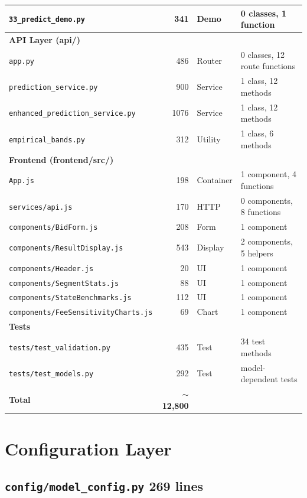 \documentclass[11pt,a4paper]{article}
\newcommand{\file}[1]{\texttt{\color{gssblue!70!black}#1}}
\newcommand{\conftag}[1]{\colorbox{configorange!15}{\small\textcolor{configorange}{\textbf{#1}}}}
\begin{document}
\begin{longtable}{l r l l}
\file{33\_predict\_demo.py} & 341 & Demo & 0 classes, 1 function \\
\midrule
\multicolumn{4}{l}{\textbf{\color{apigreen}API Layer (api/)}} \\
\file{app.py} & 486 & Router & 0 classes, 12 route functions \\
\file{prediction\_service.py} & 900 & Service & 1 class, 12 methods \\
\file{enhanced\_prediction\_service.py} & 1076 & Service & 1 class, 12 methods \\
\file{empirical\_bands.py} & 312 & Utility & 1 class, 6 methods \\
\midrule
\multicolumn{4}{l}{\textbf{\color{uipurple}Frontend (frontend/src/)}} \\
\file{App.js} & 198 & Container & 1 component, 4 functions \\
\file{services/api.js} & 170 & HTTP & 0 components, 8 functions \\
\file{components/BidForm.js} & 208 & Form & 1 component \\
\file{components/ResultDisplay.js} & 543 & Display & 2 components, 5 helpers \\
\file{components/Header.js} & 20 & UI & 1 component \\
\file{components/SegmentStats.js} & 88 & UI & 1 component \\
\file{components/StateBenchmarks.js} & 112 & UI & 1 component \\
\file{components/FeeSensitivityCharts.js} & 69 & Chart & 1 component \\
\midrule
\multicolumn{4}{l}{\textbf{Tests}} \\
\file{tests/test\_validation.py} & 435 & Test & 34 test methods \\
\file{tests/test\_models.py} & 292 & Test & model-dependent tests \\
\midrule
\textbf{Total} & \textbf{$\sim$12{,}800} & & \\
\bottomrule
\end{longtable}

\section{Configuration Layer}
\label{sec:config}

\subsection{\file{config/model\_config.py} \conftag{269 lines}}
\end{document}
